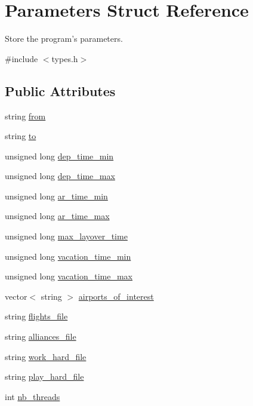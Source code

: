 \hypertarget{struct_parameters}{\section{Parameters Struct Reference}
\label{struct_parameters}
}


Store the program's parameters.  




{\ttfamily \#include $<$types.\-h$>$}

\subsection*{Public Attributes}
\begin{DoxyCompactItemize}
\item 
string \hyperlink{struct_parameters_a0d67e8c0ef1b8c7edcf58fcd4946a16d}{from}
\item 
string \hyperlink{struct_parameters_ab8ca164d6c88742405fb8506016aa150}{to}
\item 
unsigned long \hyperlink{struct_parameters_aa36f6191b750b3efd7f9b1920f00f37c}{dep\-\_\-time\-\_\-min}
\item 
unsigned long \hyperlink{struct_parameters_a29fbab0336259cdd94699051db902096}{dep\-\_\-time\-\_\-max}
\item 
unsigned long \hyperlink{struct_parameters_acb0d745687908cfb5f09684adc7c63c3}{ar\-\_\-time\-\_\-min}
\item 
unsigned long \hyperlink{struct_parameters_af9c8e3eda9f9dca8c6983a32bdc9e0e4}{ar\-\_\-time\-\_\-max}
\item 
unsigned long \hyperlink{struct_parameters_a6280501b946429cdd733d81596cd65ae}{max\-\_\-layover\-\_\-time}
\item 
unsigned long \hyperlink{struct_parameters_a9149c9562e23842a0bfeea6cf3435119}{vacation\-\_\-time\-\_\-min}
\item 
unsigned long \hyperlink{struct_parameters_a36f22346c58dab71473c7920451f8100}{vacation\-\_\-time\-\_\-max}
\item 
vector$<$ string $>$ \hyperlink{struct_parameters_a119abefcf756bb820a8b03929bfaaa7d}{airports\-\_\-of\-\_\-interest}
\item 
string \hyperlink{struct_parameters_a5c748d49ace4e05373034e0e873ad2e7}{flights\-\_\-file}
\item 
string \hyperlink{struct_parameters_a108e892c2cacb8b7cb7d5abe4e0ca2e0}{alliances\-\_\-file}
\item 
string \hyperlink{struct_parameters_a5e8fd1fc0d362cde3e1e5094d3f8b253}{work\-\_\-hard\-\_\-file}
\item 
string \hyperlink{struct_parameters_aeeca8945df96e268a29d00b284f00815}{play\-\_\-hard\-\_\-file}
\item 
int \hyperlink{struct_parameters_a930705020fe78a5e1a071aba1b85402d}{nb\-\_\-threads}
\end{DoxyCompactItemize}


